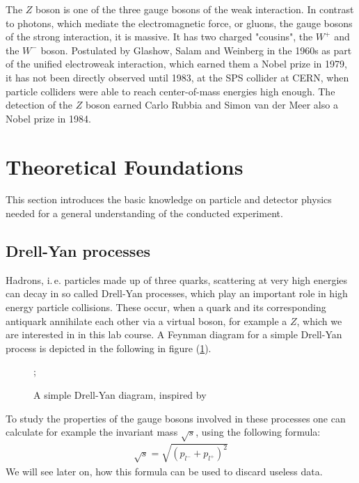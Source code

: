 \documentclass[twocolumn,
			   showpacs,%
               nofootinbib,
               aps,%
               prd,
               notitlepage,
               showkeys,
               10pt]{revtex4-1}
\begin{document}
The $Z$ boson is one of the three gauge bosons of the weak interaction. In contrast to photons, which mediate the electromagnetic force, or gluons, the gauge bosons of the strong interaction, it is massive. It has two charged "cousins", the $W^+$ and the $W^-$ boson. Postulated by Glashow, Salam and Weinberg in the 1960s as part of the unified electroweak interaction, which earned them a Nobel prize in 1979, it has not been directly observed until 1983, at the SPS collider at CERN, when particle colliders were able to reach center-of-mass energies high enough. The detection of the $Z$ boson earned Carlo Rubbia and Simon van der Meer also a Nobel prize in 1984.   


\section{Theoretical Foundations}
This section introduces the basic knowledge on particle and detector physics needed for a general understanding of the conducted experiment.

\subsection{Drell-Yan processes}
Hadrons, i.\,e. particles made up of three quarks, scattering at very high energies can decay in so called Drell-Yan processes, which play an important role in high energy particle collisions. These occur, when a quark and its corresponding antiquark annihilate each other via a virtual boson, for example a $Z$, which we are interested in in this lab course. A Feynman diagram for a simple Drell-Yan process is depicted in the following in figure (\ref{fig:Drell-Yan}).

\begin{figure}[H]
\centering
{};
\caption{A simple Drell-Yan diagram, inspired by \cite{F91manual}}
\label{fig:Drell-Yan}
\end{figure}
	
To study the properties of the gauge bosons involved in these processes one can calculate for example the invariant mass $\sqrt{s}$, using the following formula:
\begin{align}
	\sqrt{s} = \sqrt{\left(p_{l^{-}} + p_{l^{+}}\right)^2}
\end{align}
We will see later on, how this formula can be used to discard useless data.
\end{document}
